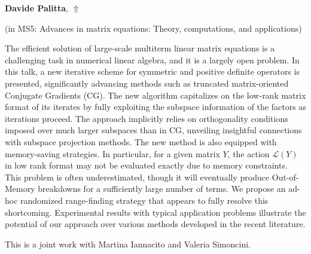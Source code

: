 \documentclass[ILAS2025-program.tex]{subfiles}
\begin{document}
\hypertarget{down0322}{}\begin{ilasabstract}
    
\textbf{Davide Palitta},  \hfill \hyperlink{up0322}{$\Uparrow$}
    
    
(in {\color{mstitle}MS5: Advances in matrix equations: Theory, computations, and applications})
        
\mtskip
    The efficient solution of large-scale multiterm linear matrix equations is a challenging task in numerical linear algebra, and it is a largely open problem. In this talk, a new iterative scheme for symmetric and positive definite operators is presented, significantly advancing methods such as truncated matrix-oriented Conjugate Gradients (CG). The new algorithm capitalizes on the low-rank matrix format of its iterates by fully exploiting the subspace information of the factors as iterations proceed. The approach implicitly relies on orthogonality conditions imposed over much larger subspaces than in CG, unveiling insightful connections with subspace projection methods. The new method is also equipped with memory-saving strategies. In particular, for a given matrix $Y$, the action $\mathcal{L}(Y)$ in low rank format may not be evaluated exactly due to memory constraints. This problem is often underestimated, though it will eventually produce Out-of-Memory breakdowns for a sufficiently large number of terms. We propose an ad-hoc randomized range-finding strategy that appears to fully resolve this shortcoming. Experimental results with typical application problems illustrate the potential of our approach over various methods developed in the recent literature.

This is a joint work with Martina Iannacito and Valeria Simoncini.

\end{ilasabstract}
    
\end{document}
